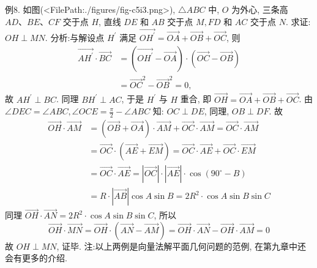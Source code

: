 例8. 如图(<FilePath:./figures/fig-c5i3.png>), $\triangle A B C$ 中, $O$ 为外心, 三条高 $A D 、 B E 、 C F$ 交于点 $H$, 直线 $D E$ 和 $A B$ 交于点 $M, F D$ 和 $A C$ 交于点 $N$. 求证: $O H \perp M N$.
分析:与解设点 $H^{\prime}$ 满足 $\overrightarrow{O H^{\prime}}=\overrightarrow{O A}+\overrightarrow{O B}+\overrightarrow{O C}$, 则
$$
\begin{aligned}
\overrightarrow{A H^{\prime}} \cdot \overrightarrow{B C} & =\left(\overrightarrow{O H^{\prime}}-\overrightarrow{O A}\right) \cdot(\overrightarrow{O C}-\overrightarrow{O B}) \\
& =\overrightarrow{O C}^2-\overrightarrow{O B}^2=0,
\end{aligned}
$$
故 $A H^{\prime} \perp B C$.
同理 $B H^{\prime} \perp A C$, 于是 $H^{\prime}$ 与 $H$ 重合, 即 $\overrightarrow{O H}=\overrightarrow{O A}+\overrightarrow{O B}+\overrightarrow{O C}$.
由 $\angle D E C=\angle A B C, \angle O C E=\frac{\pi}{2}-\angle A B C$ 知: $O C \perp D E$, 同理, $O B \perp D F$. 故
$$
\begin{aligned}
\overrightarrow{O H} \cdot \overrightarrow{A M} & =(\overrightarrow{O B}+\overrightarrow{O A}) \cdot \overrightarrow{A M}+\overrightarrow{O C} \cdot \overrightarrow{A M}=\overrightarrow{O C} \cdot \overrightarrow{A M} \\
& =\overrightarrow{O C} \cdot(\overrightarrow{A E}+\overrightarrow{E M})=\overrightarrow{O C} \cdot \overrightarrow{A E}+\overrightarrow{O C} \cdot \overrightarrow{E M} \\
& =\overrightarrow{O C} \cdot \overrightarrow{A E}=|\overrightarrow{O C}| \cdot|\overrightarrow{A E}| \cdot \cos \left(90^{\circ}-B\right) \\
& =R \cdot|\overrightarrow{A B}| \cos A \sin B=2 R^2 \cdot \cos A \sin B \sin C
\end{aligned}
$$
同理 $\overrightarrow{O H} \cdot \overrightarrow{A N}=2 R^2 \cdot \cos A \sin B \sin C$, 所以
$$
\overrightarrow{O H} \cdot \overrightarrow{M N}=\overrightarrow{O H} \cdot(\overrightarrow{A N}-\overrightarrow{A M})=\overrightarrow{O H} \cdot \overrightarrow{A N}-\overrightarrow{O H} \cdot \overrightarrow{A M}=0
$$
故 $O H \perp M N$, 证毕.
注:以上两例是向量法解平面几何问题的范例, 在第九章中还会有更多的介绍.


